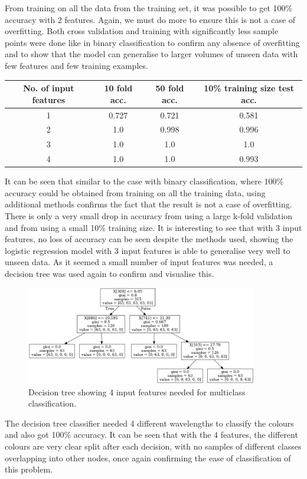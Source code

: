 \documentclass{article}
\begin{document}
From training on all the data from the training set, it was possible to get 100\% accuracy with 2 features. Again, we must do more to ensure this is not a case of overfitting. Both cross validation and training with significantly less sample points were done like in binary classification to confirm any absence of overfitting and to show that the model can generalise to larger volumes of unseen data with few features and few training examples. 
\begin{table}[H]
\centering
\begin{tabular}{| c | c | c | c |}
\hline
\textbf{No. of input features} & \textbf{10 fold acc.} & \textbf{50 fold acc.} & \textbf{10\% training size test acc.} \\
\hline
1 & 0.727 & 0.721 & 0.581 \\
\hline
2 & 1.0 & 0.998 & 0.996 \\
\hline
3 & 1.0 & 1.0 & 1.0 \\
\hline
4 & 1.0 & 1.0 & 0.993 \\
\hline
\end{tabular}
\end{table}
\noindent
It can be seen that similar to the case with binary classification, where 100\% accuracy could be obtained from training on all the training data, using additional methods confirms the fact that the result is not a case of overfitting. There is only a very small drop in accuracy from using a large k-fold validation and from using a small 10\% training size. It is interesting to see that with 3 input features, no loss of accuracy can be seen despite the methods used, showing the logistic regression model with 3 input features is able to generalise very well to unseen data. 
\n
As it seemed a small number of input features was needed, a decision tree was used again to confirm and visualise this. 
\begin{figure}[H]
\centering
\includegraphics[width=0.9\textwidth, keepaspectratio]{imgs/multiclass-decisiontree.png}
\caption{Decision tree showing 4 input features needed for multiclass classification.}
\end{figure}
\noindent
The decision tree classifier needed 4 different wavelengths to classify the colours and also got 100\% accuracy. It can be seen that with the 4 features, the different colours are very clear split after each decision, with no samples of different classes overlapping into other nodes, once again confirming the ease of classification of this problem. 
\end{document}
